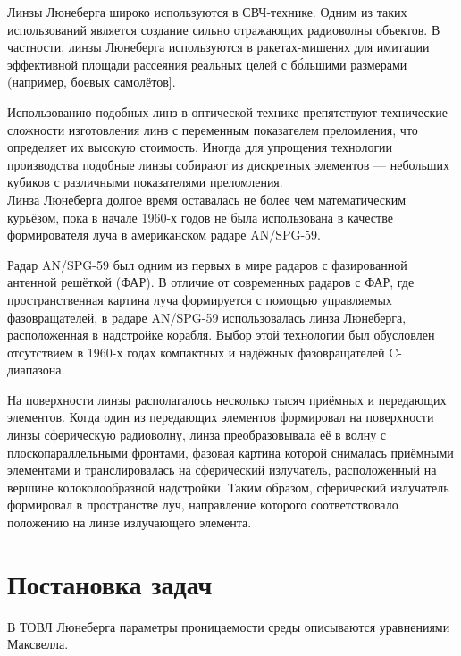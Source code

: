\documentclass{article}
\begin{document}
Линзы Люнеберга широко используются в СВЧ-технике. Одним из таких использований является создание сильно отражающих радиоволны объектов. В частности, линзы Люнеберга используются в ракетах-мишенях для имитации эффективной площади рассеяния реальных целей с бо́льшими размерами (например, боевых самолётов].

Использованию подобных линз в оптической технике препятствуют технические сложности изготовления линз с переменным показателем преломления, что определяет их высокую стоимость. Иногда для упрощения технологии производства подобные линзы собирают из дискретных элементов — небольших кубиков с различными показателями преломления.\\[10pt]

Линза Люнеберга долгое время оставалась не более чем математическим курьёзом, пока в начале 1960-х годов не была использована в качестве формирователя луча в американском радаре AN/SPG-59.

Радар AN/SPG-59 был одним из первых в мире радаров с фазированной антенной решёткой (ФАР). В отличие от современных радаров с ФАР, где пространственная картина луча формируется с помощью управляемых фазовращателей, в радаре AN/SPG-59 использовалась линза Люнеберга, расположенная в надстройке корабля. Выбор этой технологии был обусловлен отсутствием в 1960-х годах компактных и надёжных фазовращателей C-диапазона.

На поверхности линзы располагалось несколько тысяч приёмных и передающих элементов. Когда один из передающих элементов формировал на поверхности линзы сферическую радиоволну, линза преобразовывала её в волну с плоскопараллельными фронтами, фазовая картина которой снималась приёмными элементами и транслировалась на сферический излучатель, расположенный на вершине колоколообразной надстройки. Таким образом, сферический излучатель формировал в пространстве луч, направление которого соответствовало положению на линзе излучающего элемента.

\newpage

\section{Постановка задач}
В ТОВЛ Люнеберга параметры проницаемости среды описываются уравнениями Максвелла.
\end{document}
